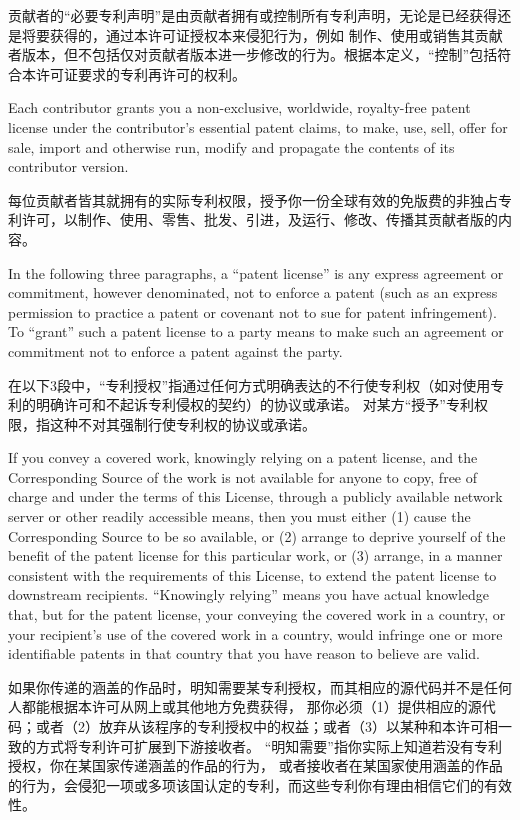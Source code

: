 \documentclass[11pt]{article}
\begin{document}
\begin{enumerate}
        贡献者的“必要专利声明”是由贡献者拥有或控制所有专利声明，无论是已经获得还是将要获得的，通过本许可证授权本来侵犯行为，例如
        制作、使用或销售其贡献者版本，但不包括仅对贡献者版本进一步修改的行为。根据本定义，“控制”包括符合本许可证要求的专利再许可的权利。

        Each contributor grants you a non-exclusive, worldwide, royalty-free
        patent license under the contributor's essential patent claims, to
        make, use, sell, offer for sale, import and otherwise run, modify and
        propagate the contents of its contributor version.

        每位贡献者皆其就拥有的实际专利权限，授予你一份全球有效的免版费的非独占专利许可，以制作、使用、零售、批发、引进，及运行、修改、传播其贡献者版的内容。

        In the following three paragraphs, a ``patent license'' is any express
        agreement or commitment, however denominated, not to enforce a patent
        (such as an express permission to practice a patent or covenant not to
        sue for patent infringement).  To ``grant'' such a patent license to a
        party means to make such an agreement or commitment not to enforce a
        patent against the party.

        在以下3段中，“专利授权”指通过任何方式明确表达的不行使专利权（如对使用专利的明确许可和不起诉专利侵权的契约）的协议或承诺。
        对某方“授予”专利权限，指这种不对其强制行使专利权的协议或承诺。

        If you convey a covered work, knowingly relying on a patent license,
        and the Corresponding Source of the work is not available for anyone
        to copy, free of charge and under the terms of this License, through a
        publicly available network server or other readily accessible means,
        then you must either (1) cause the Corresponding Source to be so
        available, or (2) arrange to deprive yourself of the benefit of the
        patent license for this particular work, or (3) arrange, in a manner
        consistent with the requirements of this License, to extend the patent
        license to downstream recipients.  ``Knowingly relying'' means you have
        actual knowledge that, but for the patent license, your conveying the
        covered work in a country, or your recipient's use of the covered work
        in a country, would infringe one or more identifiable patents in that
        country that you have reason to believe are valid.

        如果你传递的涵盖的作品时，明知需要某专利授权，而其相应的源代码并不是任何人都能根据本许可从网上或其他地方免费获得，
        那你必须（1）提供相应的源代码；或者（2）放弃从该程序的专利授权中的权益；或者（3）以某种和本许可相一致的方式将专利许可扩展到下游接收者。
        “明知需要”指你实际上知道若没有专利授权，你在某国家传递涵盖的作品的行为，
        或者接收者在某国家使用涵盖的作品的行为，会侵犯一项或多项该国认定的专利，而这些专利你有理由相信它们的有效性。


\end{enumerate}
\end{document}
